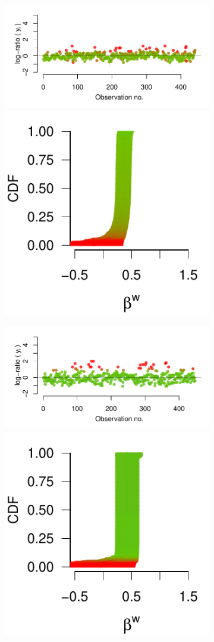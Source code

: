 \documentclass[9pt,a4paper,twocolumn,lineno]{article}
\begin{document}
\begin{figure}
\begin{subfigure}{.49\linewidth}
		{\includegraphics[width=.65\linewidth]{threads/thread_history_148_3}	\includegraphics[width=.33\linewidth]{betas/beta_history_148_3}}
		
		{\includegraphics[width=.65\linewidth]{threads/thread_history_403_9}			\includegraphics[width=.33\linewidth]{betas/beta_history_403_9}}
		

\end{subfigure}
\end{figure}
\end{document}
